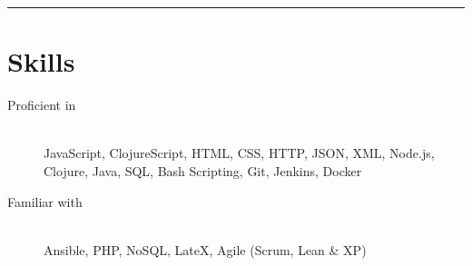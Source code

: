 \vspace{1em}
\hrule
\section*{Skills}

\begin{description}
\item[Proficient in] \hfill \\ JavaScript, ClojureScript, HTML, CSS, HTTP, JSON,
  XML, Node.js, Clojure, Java, SQL, Bash Scripting, Git, Jenkins, Docker
\item[Familiar with] \hfill \\ Ansible, PHP, NoSQL, LateX, Agile (Scrum, Lean \&
  XP)
\end{description}
